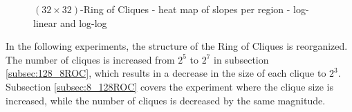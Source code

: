 \begin{figure}[!ht]
    \centering
    \hfil
    \caption{$(32\times32)$-Ring of Cliques - heat map of slopes per region - log-linear and log-log}
        \label{fig:ringOfCliquesslopes}
\end{figure}

In the following experiments, the structure of the Ring of Cliques is reorganized. The number of cliques is increased from $2^{5}$ to $2^{7}$ in subsection \ref{subsec:128_8ROC}, which results in a decrease in the size of each clique to $2^{3}$. Subsection \ref{subsec:8_128ROC} covers the experiment where the clique size is increased, while the number of cliques is decreased by the same magnitude.

